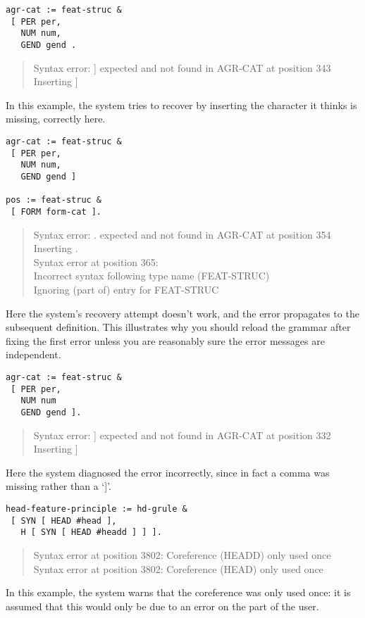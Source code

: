 \documentclass[12pt]{report}
\newenvironment{error}%
{\begin{quote}
\tt
}%
{\end{quote}
}
\begin{document}
\begin{verbatim}
agr-cat := feat-struc &
 [ PER per,
   NUM num,
   GEND gend .
\end{verbatim}
\begin{error}
Syntax error: ] expected and not found in AGR-CAT at position 343\\
Inserting ]
\end{error}
In this example, the system tries to recover by inserting the character
it thinks is missing, correctly here.

\begin{verbatim}
agr-cat := feat-struc &
 [ PER per,
   NUM num,
   GEND gend ] 

pos := feat-struc &
 [ FORM form-cat ].

\end{verbatim}
\begin{error}
Syntax error: . expected and not found in AGR-CAT at position 354\\
Inserting .\\
Syntax error at position 365:\\ 
Incorrect syntax following type name (FEAT-STRUC)\\
Ignoring (part of) entry for FEAT-STRUC
\end{error}
Here the system's recovery attempt doesn't work, and the error 
propagates to the subsequent definition.  This illustrates
why you should reload the grammar after fixing the first error
unless you are reasonably sure the error messages are independent.

\begin{verbatim}
agr-cat := feat-struc &
 [ PER per,
   NUM num
   GEND gend ]. 
\end{verbatim}
\begin{error}
Syntax error: ] expected and not found in AGR-CAT at position 332\\
Inserting ]
\end{error}
Here the system diagnosed the error incorrectly, since in fact
a comma was missing rather than a `]'.  

\begin{verbatim}
head-feature-principle := hd-grule & 
 [ SYN [ HEAD #head ],
   H [ SYN [ HEAD #headd ] ] ].
\end{verbatim}
\begin{error}
Syntax error at position 3802: Coreference (HEADD) only used once
Syntax error at position 3802: Coreference (HEAD) only used once
\end{error}
In this example, the system warns that the coreference was only used 
once: it is assumed that this would only be due to an error on the part of 
the user.
\end{document}
